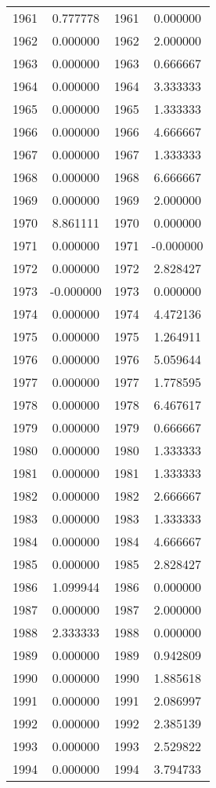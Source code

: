 \documentclass[12pt]{article}
\begin{document}
\begin{longtable}{@{}cccc@{}}
1961 & 0.777778 & 1961 & 0.000000 \\
1962 & 0.000000 & 1962 & 2.000000 \\
1963 & 0.000000 & 1963 & 0.666667 \\
1964 & 0.000000 & 1964 & 3.333333 \\
1965 & 0.000000 & 1965 & 1.333333 \\
1966 & 0.000000 & 1966 & 4.666667 \\
1967 & 0.000000 & 1967 & 1.333333 \\
1968 & 0.000000 & 1968 & 6.666667 \\
1969 & 0.000000 & 1969 & 2.000000 \\
1970 & 8.861111 & 1970 & 0.000000 \\
1971 & 0.000000 & 1971 & -0.000000 \\
1972 & 0.000000 & 1972 & 2.828427 \\
1973 & -0.000000 & 1973 & 0.000000 \\
1974 & 0.000000 & 1974 & 4.472136 \\
1975 & 0.000000 & 1975 & 1.264911 \\
1976 & 0.000000 & 1976 & 5.059644 \\
1977 & 0.000000 & 1977 & 1.778595 \\
1978 & 0.000000 & 1978 & 6.467617 \\
1979 & 0.000000 & 1979 & 0.666667 \\
1980 & 0.000000 & 1980 & 1.333333 \\
1981 & 0.000000 & 1981 & 1.333333 \\
1982 & 0.000000 & 1982 & 2.666667 \\
1983 & 0.000000 & 1983 & 1.333333 \\
1984 & 0.000000 & 1984 & 4.666667 \\
1985 & 0.000000 & 1985 & 2.828427 \\
1986 & 1.099944 & 1986 & 0.000000 \\
1987 & 0.000000 & 1987 & 2.000000 \\
1988 & 2.333333 & 1988 & 0.000000 \\
1989 & 0.000000 & 1989 & 0.942809 \\
1990 & 0.000000 & 1990 & 1.885618 \\
1991 & 0.000000 & 1991 & 2.086997 \\
1992 & 0.000000 & 1992 & 2.385139 \\
1993 & 0.000000 & 1993 & 2.529822 \\
1994 & 0.000000 & 1994 & 3.794733 \\

\end{longtable}
\end{document}
